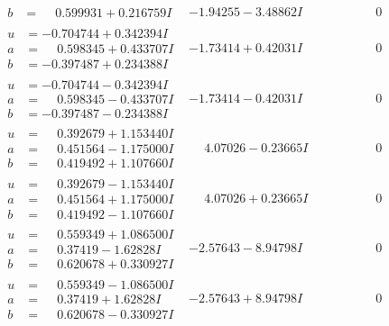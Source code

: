 \documentclass[1p]{elsarticle_modified}
\theoremstyle{definition}
\begin{document}
$$\begin{array}{c|c|c}
\begin{aligned}
b &= \phantom{-}0.599931 + 0.216759 I\end{aligned}
 & -1.94255 - 3.48862 I & \phantom{-0.000000 } 0 \\ \hline\begin{aligned}
u &= -0.704744 + 0.342394 I \\
a &= \phantom{-}0.598345 + 0.433707 I \\
b &= -0.397487 + 0.234388 I\end{aligned}
 & -1.73414 + 0.42031 I & \phantom{-0.000000 } 0 \\ \hline\begin{aligned}
u &= -0.704744 - 0.342394 I \\
a &= \phantom{-}0.598345 - 0.433707 I \\
b &= -0.397487 - 0.234388 I\end{aligned}
 & -1.73414 - 0.42031 I & \phantom{-0.000000 } 0 \\ \hline\begin{aligned}
u &= \phantom{-}0.392679 + 1.153440 I \\
a &= \phantom{-}0.451564 - 1.175000 I \\
b &= \phantom{-}0.419492 + 1.107660 I\end{aligned}
 & \phantom{-}4.07026 - 0.23665 I & \phantom{-0.000000 } 0 \\ \hline\begin{aligned}
u &= \phantom{-}0.392679 - 1.153440 I \\
a &= \phantom{-}0.451564 + 1.175000 I \\
b &= \phantom{-}0.419492 - 1.107660 I\end{aligned}
 & \phantom{-}4.07026 + 0.23665 I & \phantom{-0.000000 } 0 \\ \hline\begin{aligned}
u &= \phantom{-}0.559349 + 1.086500 I \\
a &= \phantom{-}0.37419 - 1.62828 I \\
b &= \phantom{-}0.620678 + 0.330927 I\end{aligned}
 & -2.57643 - 8.94798 I & \phantom{-0.000000 } 0 \\ \hline\begin{aligned}
u &= \phantom{-}0.559349 - 1.086500 I \\
a &= \phantom{-}0.37419 + 1.62828 I \\
b &= \phantom{-}0.620678 - 0.330927 I\end{aligned}
 & -2.57643 + 8.94798 I & \phantom{-0.000000 } 0\\

\end{array}$$
\end{document}

